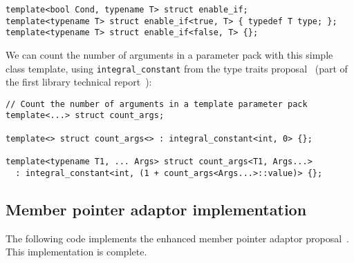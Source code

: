 \documentclass{article}
\begin{document}
\small
\begin{verbatim}
template<bool Cond, typename T> struct enable_if;
template<typename T> struct enable_if<true, T> { typedef T type; };
template<typename T> struct enable_if<false, T> {};
\end{verbatim}
\normalsize

We can count the number of arguments in a parameter pack with this
simple class template, using {\tt integral\_constant} from the type
traits proposal~\cite{Maddock03} (part of the first library technical
report~\cite{Austern03}):

\small
\begin{verbatim}
// Count the number of arguments in a template parameter pack
template<...> struct count_args;

template<> struct count_args<> : integral_constant<int, 0> {};

template<typename T1, ... Args> struct count_args<T1, Args...>
  : integral_constant<int, (1 + count_args<Args...>::value)> {};
\end{verbatim}
\normalsize

\subsection{Member pointer adaptor implementation}
\label{mem_fnimpl}
The following code implements the enhanced member pointer adaptor
proposal~\cite{Dimov03a}. This implementation is complete.
\end{document}
